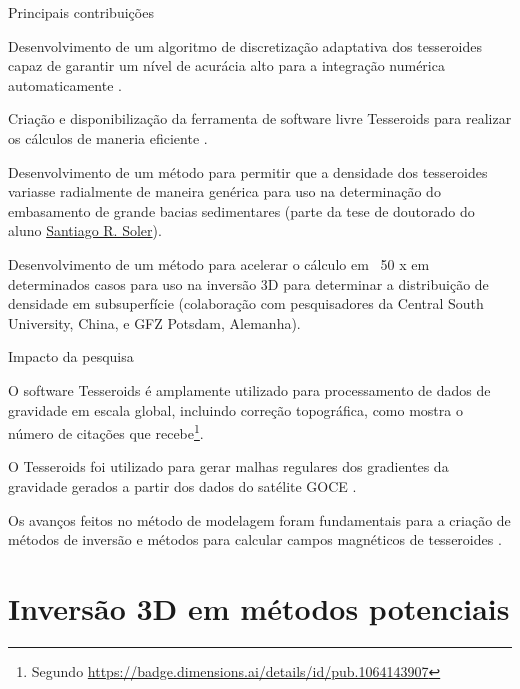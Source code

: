 \documentclass[10pt,a4paper,oneside]{book}
\newcommand{\SantiagoLink}{\href{https://www.santisoler.com/}{Santiago R. Soler}}
\begin{document}
\begin{fancyenum}{\faLightbulb}{Principais contribuições}
  \item Desenvolvimento de um algoritmo de discretização adaptativa dos
    tesseroides capaz de garantir um nível de acurácia alto para a integração
    numérica automaticamente \citep{Uieda2016}.
  \item Criação e disponibilização da ferramenta de software livre Tesseroids
    para realizar os cálculos de maneria eficiente \citep{Uieda2016}.
  \item Desenvolvimento de um método para permitir que a densidade dos
    tesseroides variasse radialmente de maneira genérica \citep{Soler2019}
    para uso na determinação do embasamento de grande bacias sedimentares
    (parte da tese de doutorado do aluno \SantiagoLink{}).
  \item Desenvolvimento de um método para acelerar o cálculo
    em ~50 x em determinados casos para uso na inversão 3D para determinar a
    distribuição de densidade em subsuperfície \citep{Zhao2019}
    (colaboração com pesquisadores da Central South University, China, e GFZ
    Potsdam, Alemanha).
\end{fancyenum}

\begin{fancyenum}{\faRocket}{Impacto da pesquisa}
  \item O software Tesseroids é amplamente utilizado para processamento de
    dados de gravidade em escala global, incluindo correção topográfica, como
    mostra o número de citações que recebe\footnote{Segundo
    \url{https://badge.dimensions.ai/details/id/pub.1064143907}}.
  \item O Tesseroids foi utilizado para gerar malhas regulares dos gradientes da
    gravidade gerados a partir dos dados do satélite GOCE \citep{Bouman2016}.
  \item Os avanços feitos no método de modelagem foram fundamentais para a
    criação de métodos de inversão \citep{Uieda2017,Zhao2019} e métodos para
    calcular campos magnéticos de tesseroides \citep{Baykiev2016}.
\end{fancyenum}



\section{Inversão 3D em métodos potenciais}
\label{sec_planting}
\end{document}
